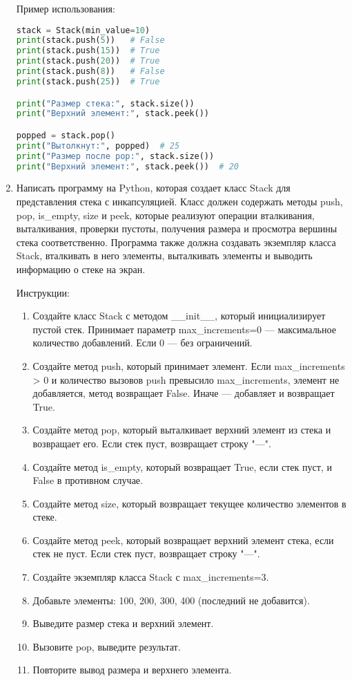 \begin{enumerate}
Пример использования:
\begin{lstlisting}[language=Python]
stack = Stack(min_value=10)
print(stack.push(5))   # False
print(stack.push(15))  # True
print(stack.push(20))  # True
print(stack.push(8))   # False
print(stack.push(25))  # True

print("Размер стека:", stack.size())
print("Верхний элемент:", stack.peek())

popped = stack.pop()
print("Вытолкнут:", popped)  # 25
print("Размер после pop:", stack.size())
print("Верхний элемент:", stack.peek())  # 20
\end{lstlisting}

\item Написать программу на Python, которая создает класс Stack для представления стека с инкапсуляцией. Класс должен содержать методы push, pop, is\_empty, size и peek, которые реализуют операции вталкивания, выталкивания, проверки пустоты, получения размера и просмотра вершины стека соответственно. Программа также должна создавать экземпляр класса Stack, вталкивать в него элементы, выталкивать элементы и выводить информацию о стеке на экран.

Инструкции:
\begin{enumerate}
    \item Создайте класс Stack с методом \_\_init\_\_, который инициализирует пустой стек. Принимает параметр max\_increments=0 — максимальное количество добавлений. Если 0 — без ограничений.
    \item Создайте метод push, который принимает элемент. Если max\_increments > 0 и количество вызовов push превысило max\_increments, элемент не добавляется, метод возвращает False. Иначе — добавляет и возвращает True.
    \item Создайте метод pop, который выталкивает верхний элемент из стека и возвращает его. Если стек пуст, возвращает строку "---".
    \item Создайте метод is\_empty, который возвращает True, если стек пуст, и False в противном случае.
    \item Создайте метод size, который возвращает текущее количество элементов в стеке.
    \item Создайте метод peek, который возвращает верхний элемент стека, если стек не пуст. Если стек пуст, возвращает строку "---".
    \item Создайте экземпляр класса Stack с max\_increments=3.
    \item Добавьте элементы: 100, 200, 300, 400 (последний не добавится).
    \item Выведите размер стека и верхний элемент.
    \item Вызовите pop, выведите результат.
    \item Повторите вывод размера и верхнего элемента.
\end{enumerate}


\end{enumerate}
